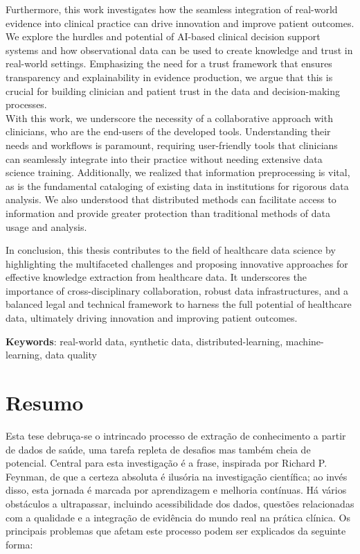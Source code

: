 Furthermore, this work investigates how the seamless integration of real-world evidence into clinical practice can drive innovation and improve patient outcomes. We explore the hurdles and potential of AI-based clinical decision support systems and how observational data can be used to create knowledge and trust in real-world settings. Emphasizing the need for a trust framework that ensures transparency and explainability in evidence production, we argue that this is crucial for building clinician and patient trust in the data and decision-making processes. \\

With this work, we underscore the necessity of a collaborative approach with clinicians, who are the end-users of the developed tools. Understanding their needs and workflows is paramount, requiring user-friendly tools that clinicians can seamlessly integrate into their practice without needing extensive data science training. Additionally, we realized that information preprocessing is vital, as is the fundamental cataloging of existing data in institutions for rigorous data analysis. We also understood that distributed methods can facilitate access to information and provide greater protection than traditional methods of data usage and analysis.

In conclusion, this thesis contributes to the field of healthcare data science by highlighting the multifaceted challenges and proposing innovative approaches for effective knowledge extraction from healthcare data. It underscores the importance of cross-disciplinary collaboration, robust data infrastructures, and a balanced legal and technical framework to harness the full potential of healthcare data, ultimately driving innovation and improving patient outcomes.



\vspace*{10mm}\noindent
\textbf{Keywords}: real-world data, synthetic data, distributed-learning, machine-learning, data quality




\chapter*{Resumo}
Esta tese debruça-se o intrincado processo de extração de conhecimento a partir de dados de saúde, uma tarefa repleta de desafios mas também cheia de potencial. Central para esta investigação é a frase, inspirada por Richard P. Feynman, de que a certeza absoluta é ilusória na investigação científica; ao invés disso, esta jornada é marcada por aprendizagem e melhoria contínuas. Há vários obstáculos a ultrapassar, incluindo acessibilidade dos dados, questões relacionadas com a qualidade e a integração de evidência do mundo real na prática clínica. Os principais problemas que afetam este processo podem ser explicados da seguinte forma:

